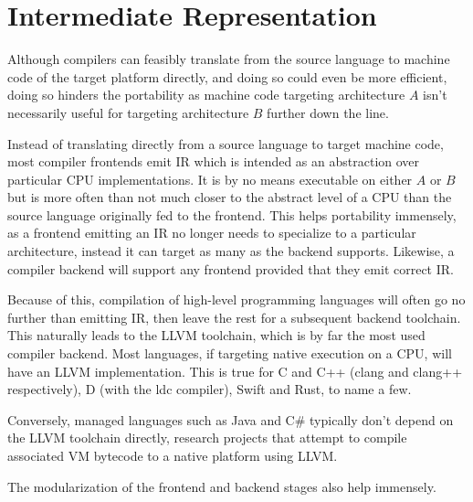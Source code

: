 \documentclass{article}
\begin{document}


\section{Intermediate Representation}


Although compilers can feasibly translate from the source language to machine code of the target platform directly, and doing so could even be more efficient, doing so hinders the portability as machine code targeting architecture \(A\) isn't necessarily useful for targeting architecture \(B\) further down the line.

Instead of translating directly from a source language to target machine code, most compiler frontends emit IR which is intended as an abstraction over particular CPU implementations. %
It is by no means executable on either \(A\) or \(B\) but is more often than not much closer to the abstract level of a CPU than the source language originally fed to the frontend.  This helps portability immensely, as a frontend emitting an IR no longer needs to specialize to a particular architecture, instead it can target as many as the backend supports.
Likewise, a compiler backend will support any frontend provided that they emit correct IR.

Because of this, compilation of high-level programming languages will often go no further than emitting IR, then leave the rest for a subsequent backend toolchain. This naturally leads to the LLVM toolchain, which is by far the most used compiler backend. Most languages, if targeting native execution on a CPU, will have an LLVM implementation. This is true for C and C++ (clang and clang++ respectively), D (with the ldc compiler), Swift and Rust, to name a few.

Conversely, managed languages such as Java and C# typically don't depend on the LLVM toolchain directly, research projects that attempt to compile associated VM bytecode to a native platform using LLVM.

The modularization of the frontend and backend stages also help immensely.
\end{document}
